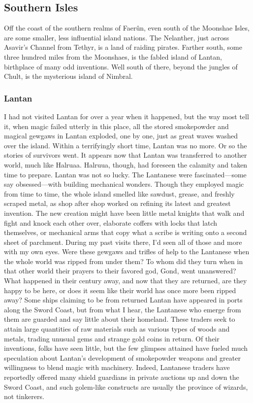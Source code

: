 \documentclass[10pt,a4paper,twoside,twocolumn,openany,bg=print,nodeprecatedcode]{dndbook}
\begin{document}
\subsection{Southern Isles}
Off the coast of the southern realms of Faerûn, even south of the Moonshae Isles, are some smaller, less influential island nations. The Nelanther, just across Asavir's Channel from Tethyr, is a land of raiding pirates. Farther south, some three hundred miles from the Moonshaes, is the fabled island of Lantan, birthplace of many odd inventions. Well south of there, beyond the jungles of Chult, is the mysterious island of Nimbral.
\subsubsection{Lantan}
I had not visited Lantan for over a year when it happened, but the way most tell it, when magic failed utterly in this place, all the stored smokepowder and magical gewgaws in Lantan exploded, one by one, just as great waves washed over the island. Within a terrifyingly short time, Lantan was no more.
Or so the stories of survivors went. It appears now that Lantan was transferred to another world, much like Halruaa. Halruua, though, had foreseen the calamity and taken time to prepare. Lantan was not so lucky.
The Lantanese were fascinated—some say obsessed—with building mechanical wonders. Though they employed magic from time to time, the whole island smelled like sawdust, grease, and freshly scraped metal, as shop after shop worked on refining its latest and greatest invention. The new creation might have been little metal knights that walk and fight and knock each other over, elaborate coffers with locks that latch themselves, or mechanical arms that copy what a scribe is writing onto a second sheet of parchment. During my past visits there, I'd seen all of those and more with my own eyes.
Were these gewgaws and trifles of help to the Lantanese when the whole world was ripped from under them? To whom did they turn when in that other world their prayers to their favored god, Gond, went unanswered? What happened in their century away, and now that they are returned, are they happy to be here, or does it seem like their world has once more been ripped away?
Some ships claiming to be from returned Lantan have appeared in ports along the Sword Coast, but from what I hear, the Lantanese who emerge from them are guarded and say little about their homeland. These traders seek to attain large quantities of raw materials such as various types of woods and metals, trading unusual gems and strange gold coins in return. Of their inventions, folks have seen little, but the few glimpses attained have fueled much speculation about Lantan's development of smokepowder weapons and greater willingness to blend magic with machinery. Indeed, Lantanese traders have reportedly offered many shield guardians in private auctions up and down the Sword Coast, and such golem-like constructs are usually the province of wizards, not tinkerers.
\end{document}
